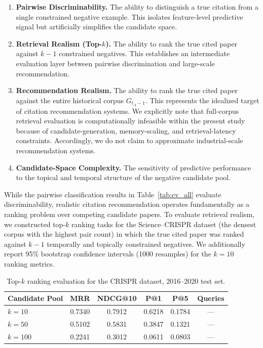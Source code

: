 \documentclass[11pt,a4paper]{article}
\begin{document}
\begin{enumerate}
    \item \textbf{Pairwise Discriminability.}
    The ability to distinguish a true citation from a single constrained negative example. This isolates feature-level predictive signal but artificially simplifies the candidate space.

    \item \textbf{Retrieval Realism (Top-\(k\)).}
    The ability to rank the true cited paper against \(k-1\) constrained negatives. This establishes an intermediate evaluation layer between pairwise discrimination and large-scale recommendation.

    \item \textbf{Recommendation Realism.}
    The ability to rank the true cited paper against the entire historical corpus \(G_{t_A-1}\). This represents the idealized target of citation recommendation systems. We explicitly note that full-corpus retrieval evaluation is computationally infeasible within the present study because of candidate-generation, memory-scaling, and retrieval-latency constraints. Accordingly, we do not claim to approximate industrial-scale recommendation systems.

    \item \textbf{Candidate-Space Complexity.}
    The sensitivity of predictive performance to the topical and temporal structure of the negative candidate pool.
\end{enumerate}

While the pairwise classification results in Table~\ref{tab:cv_all} evaluate discriminability, realistic citation recommendation operates fundamentally as a ranking problem over competing candidate papers. To evaluate retrieval realism, we constructed top-\(k\) ranking tasks for the Science--CRISPR dataset (the densest corpus with the highest pair count) in which the true cited paper was ranked against \(k-1\) temporally and topically constrained negatives. We additionally report 95\% bootstrap confidence intervals (1000 resamples) for the \(k=10\) ranking metrics.

\begin{table}[H]
\centering
\caption{Top-\(k\) ranking evaluation for the CRISPR dataset, 2016--2020 test set.}
\label{tab:ranking}
\begin{tabular}{lccccc}
\toprule
\textbf{Candidate Pool} & \textbf{MRR} & \textbf{NDCG@10} & \textbf{P@1} & \textbf{P@5} & \textbf{Queries} \\
\midrule
\(k=10\) & 0.7340 & 0.7912 & 0.6218 & 0.1784 & --- \\
\(k=50\) & 0.5102 & 0.5831 & 0.3847 & 0.1321 & --- \\
\(k=100\) & 0.2241 & 0.3012 & 0.0611 & 0.0803 & --- \\
\bottomrule
\end{tabular}
\end{table}
\end{document}
